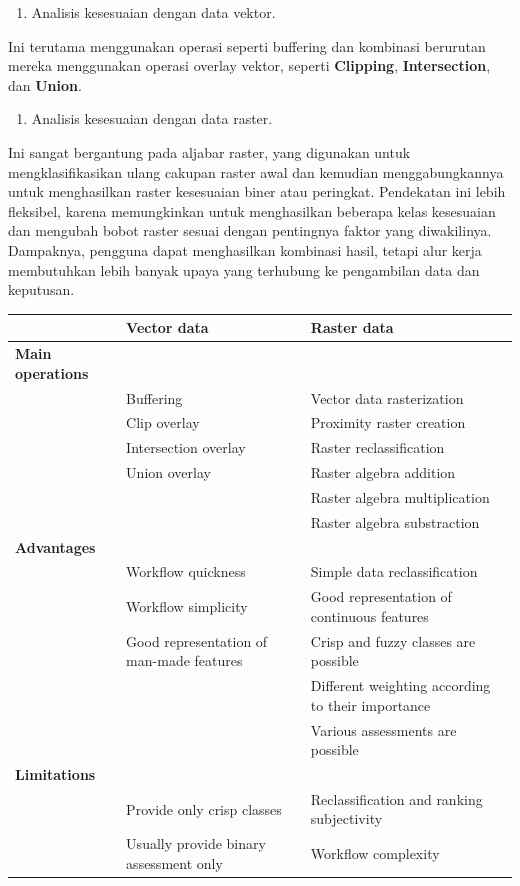 \documentclass[]{book}
\providecommand{\tightlist}{%
  \setlength{\itemsep}{0pt}\setlength{\parskip}{0pt}}
\begin{document}
\begin{enumerate}
\def\labelenumi{\arabic{enumi}.}
\tightlist
\item
  Analisis kesesuaian dengan data vektor.
\end{enumerate}

Ini terutama menggunakan operasi seperti buffering dan kombinasi berurutan mereka menggunakan operasi overlay vektor, seperti \textbf{Clipping}, \textbf{Intersection}, dan \textbf{Union}.

\begin{enumerate}
\def\labelenumi{\arabic{enumi}.}
\setcounter{enumi}{1}
\tightlist
\item
  Analisis kesesuaian dengan data raster.
\end{enumerate}

Ini sangat bergantung pada aljabar raster, yang digunakan untuk mengklasifikasikan ulang cakupan raster awal dan kemudian menggabungkannya untuk menghasilkan raster kesesuaian biner atau peringkat. Pendekatan ini lebih fleksibel, karena memungkinkan untuk menghasilkan beberapa kelas kesesuaian dan mengubah bobot raster sesuai dengan pentingnya faktor yang diwakilinya. Dampaknya, pengguna dapat menghasilkan kombinasi hasil, tetapi alur kerja membutuhkan lebih banyak upaya yang terhubung ke pengambilan data dan keputusan.

\newpage

\begin{longtable}[]{@{}lll@{}}
\toprule
& Vector data & Raster data\tabularnewline
\midrule
\endhead
\textbf{Main operations} & &\tabularnewline
& Buffering & Vector data rasterization\tabularnewline
& Clip overlay & Proximity raster creation\tabularnewline
& Intersection overlay & Raster reclassification\tabularnewline
& Union overlay & Raster algebra addition\tabularnewline
& & Raster algebra multiplication\tabularnewline
& & Raster algebra substraction\tabularnewline
\textbf{Advantages} & &\tabularnewline
& Workflow quickness & Simple data reclassification\tabularnewline
& Workflow simplicity & Good representation of continuous features\tabularnewline
& Good representation of man-made features & Crisp and fuzzy classes are possible\tabularnewline
& & Different weighting according to their importance\tabularnewline
& & Various assessments are possible\tabularnewline
\textbf{Limitations} & &\tabularnewline
& Provide only crisp classes & Reclassification and ranking subjectivity\tabularnewline
& Usually provide binary assessment only & Workflow complexity\tabularnewline
\bottomrule
\end{longtable}
\end{document}
